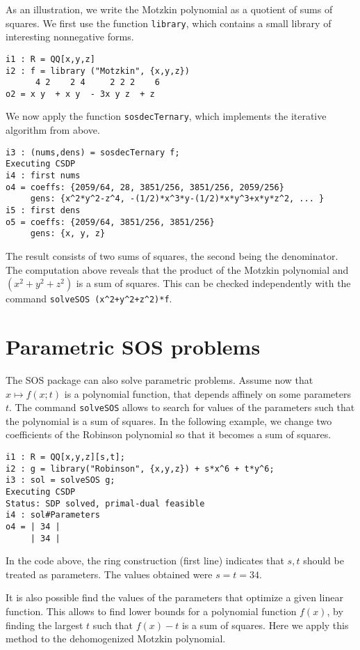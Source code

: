 \documentclass[11pt]{amsart}
\theoremstyle{plain}%
\theoremstyle{definition}
\theoremstyle{remark}
\newcommand{\SOS}{\textsc{SOS}\xspace}
\begin{document}
As an illustration, we write the Motzkin polynomial as a quotient of sums of squares.
We first use the function \verb|library|, which contains a small library of interesting nonnegative forms.
{\small
\begin{verbatim}
i1 : R = QQ[x,y,z]
i2 : f = library ("Motzkin", {x,y,z})
      4 2    2 4     2 2 2    6
o2 = x y  + x y  - 3x y z  + z
\end{verbatim}
}
\noindent
We now apply the function \verb|sosdecTernary|, which implements the iterative algorithm from above.
{\small
\begin{verbatim}
i3 : (nums,dens) = sosdecTernary f;
Executing CSDP
i4 : first nums
o4 = coeffs: {2059/64, 28, 3851/256, 3851/256, 2059/256}
     gens: {x^2*y^2-z^4, -(1/2)*x^3*y-(1/2)*x*y^3+x*y*z^2, ... }
i5 : first dens
o5 = coeffs: {2059/64, 3851/256, 3851/256}
     gens: {x, y, z}
\end{verbatim}
}
\noindent
The result consists of two sums of squares, the second being the denominator.
The computation above reveals that the product of the Motzkin polynomial and $(x^2{+}y^2{+}z^2)$ is a sum of squares.
This can be checked independently with the command \verb|solveSOS (x^2+y^2+z^2)*f|.

\section{Parametric SOS problems}

The \SOS package can also solve parametric problems.
Assume now that $x \mapsto f(x;t)$ is a polynomial function, that depends affinely on some parameters~$t$.
The command \verb|solveSOS| allows to search for values of the parameters such that the polynomial is a sum of squares.
In the following example, we change two coefficients of the Robinson polynomial so that it becomes a sum of squares.
{\small
\begin{verbatim}
i1 : R = QQ[x,y,z][s,t];
i2 : g = library("Robinson", {x,y,z}) + s*x^6 + t*y^6;
i3 : sol = solveSOS g;
Executing CSDP
Status: SDP solved, primal-dual feasible
i4 : sol#Parameters
o4 = | 34 |
     | 34 |
\end{verbatim}
}

\noindent
In the code above, the ring construction (first line) indicates that $s,t$ should be treated as parameters.
The values obtained were $s=t=34$.

It is also possible find the values of the parameters that optimize a given linear function.
This allows to find lower bounds for a polynomial function $f(x)$,
by finding the largest $t$ such that $f(x)-t$ is a sum of squares.
Here we apply this method to the dehomogenized Motzkin polynomial.
\end{document}
